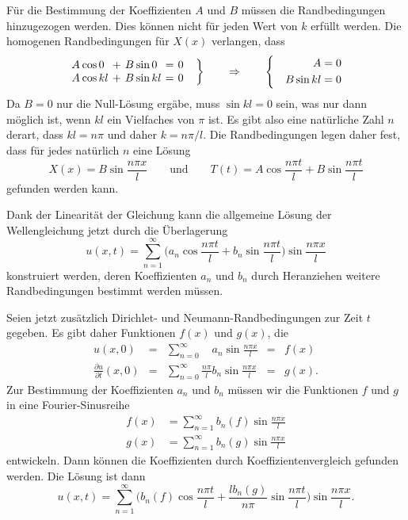 Für die Bestimmung der Koeffizienten $A$ und $B$ müssen die 
Randbedingungen hinzugezogen werden.
Dies können nicht für jeden Wert von $k$ erfüllt werden.
Die homogenen Randbedingungen für $X(x)$ verlangen, dass
\begin{equation*}
\left.
\bgroup
\renewcommand{\arraycolsep}{1pt}
\begin{array}{rlcrlcl}
A&\cos 0 &\,+\,&B&\sin 0  &\,=\,& 0\\
A&\cos kl&\,+\,&B&\sin kl &\,=\,& 0
\end{array}
\egroup
\quad
\right\}
\qquad\Rightarrow\qquad
\left\{
\quad
\begin{aligned}
        A&= 0 \\
B\sin kl &= 0
\end{aligned}
\right.
\end{equation*}
Da $B=0$ nur die Null-Lösung ergäbe, muss $\sin kl=0$ sein, was nur
dann möglich ist, wenn $kl$ ein Vielfaches von $\pi$ ist.
Es gibt also eine natürliche Zahl $n$ derart, dass
$kl=n\pi$ und daher $k=n\pi/l$.
Die Randbedingungen legen daher fest, dass für jedes natürlich $n$ eine
Lösung
\[
X(x) = B \sin \frac{n\pi x}{l}
\qquad\text{und}\qquad
T(t) = A \cos \frac{n\pi t}{l} + B \sin\frac{n\pi t}{l}
\]
gefunden werden kann.

Dank der Linearität der Gleichung kann die allgemeine Lösung der
Wellengleichung jetzt durch die Überlagerung
\[
u(x,t)
=
\sum_{n=1}^\infty
\biggl(
a_n\cos\frac{n\pi t}{l}
+
b_n\sin\frac{n\pi t}{l}
\biggr)
\sin\frac{n\pi x}{l}
\]
konstruiert werden, deren Koeffizienten $a_n$ und $b_n$ durch
Heranziehen weitere Randbedingungen bestimmt werden müssen.

Seien jetzt zusätzlich Dirichlet- und Neumann-Randbedingungen zur Zeit
$t$ gegeben.
Es gibt daher Funktionen $f(x)$ und $g(x)$, die
\[
\renewcommand{\arraycolsep}{2pt}
\begin{array}{rclcl}
u(x,0)
&=&
\displaystyle
\sum_{n=0}^\infty \phantom{\frac{n\pi}{l}}a_n \sin\frac{n\pi x}{l}
&=&
f(x) \\
\displaystyle
\frac{\partial u}{\partial t}(x,0)
&=&
\displaystyle
\sum_{n=0}^\infty \frac{n\pi}{l}b_n \sin\frac{n\pi x}{l}
&=&
g(x).
\end{array}
\]
Zur Bestimmung der Koeffizienten $a_n$ und $b_n$ müssen wir die
Funktionen $f$ und $g$ in eine Fourier-Sinusreihe
\begin{align*}
f(x) & = \sum_{n=1}^\infty b_n(f)\sin \frac{n\pi x}{l} \\
g(x) & = \sum_{n=1}^\infty b_n(g)\sin \frac{n\pi x}{l}
\end{align*}
entwickeln.
Dann können die Koeffizienten durch Koeffizientenvergleich gefunden
werden.
Die Lösung ist dann
\[
u(x,t)
=
\sum_{n=1}^\infty
\biggl(
b_n(f)
\cos\frac{n\pi t}{l}
+
\frac{lb_n(g)}{n\pi}
\sin\frac{n\pi t}{l}
\biggr)
\sin\frac{n\pi x}{l}.
\]

